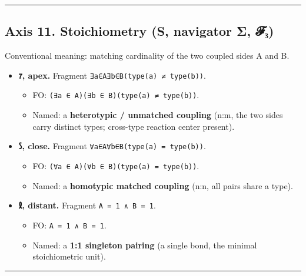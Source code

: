 \documentclass[12pt,a4paper]{article}
\begin{document}
\begin{center}\rule{0.5\linewidth}{0.5pt}\end{center}

\hypertarget{axis-11.-stoichiometry-s-navigator-ux3c3-ux1d4d5ux2083}{%
\subsection{Axis 11. Stoichiometry (S, navigator Σ,
𝓕₃)}\label{axis-11.-stoichiometry-s-navigator-ux3c3-ux1d4d5ux2083}}

Conventional meaning: matching cardinality of the two coupled sides A
and B.

\begin{itemize}
\tightlist
\item
  \textbf{𐑳, apex.} Fragment \texttt{∃a∈A∃b∈B(type(a)\ ≠\ type(b))}.

  \begin{itemize}
  \tightlist
  \item
    FO: \texttt{(∃a\ ∈\ A)(∃b\ ∈\ B)(type(a)\ ≠\ type(b))}.
  \item
    Named: a \textbf{heterotypic / unmatched coupling} (n:m, the two
    sides carry distinct types; cross-type reaction center present).
  \end{itemize}
\item
  \textbf{𐑕, close.} Fragment \texttt{∀a∈A∀b∈B(type(a)\ =\ type(b))}.

  \begin{itemize}
  \tightlist
  \item
    FO: \texttt{(∀a\ ∈\ A)(∀b\ ∈\ B)(type(a)\ =\ type(b))}.
  \item
    Named: a \textbf{homotypic matched coupling} (n:n, all pairs share a
    type).
  \end{itemize}
\item
  \textbf{𐑙, distant.} Fragment
  \texttt{\textbar{}A\textbar{}\ =\ 1\ ∧\ \textbar{}B\textbar{}\ =\ 1}.

  \begin{itemize}
  \tightlist
  \item
    FO:
    \texttt{\textbar{}A\textbar{}\ =\ 1\ ∧\ \textbar{}B\textbar{}\ =\ 1}.
  \item
    Named: a \textbf{1:1 singleton pairing} (a single bond, the minimal
    stoichiometric unit).
  \end{itemize}
\end{itemize}

\begin{center}\rule{0.5\linewidth}{0.5pt}\end{center}
\end{document}
